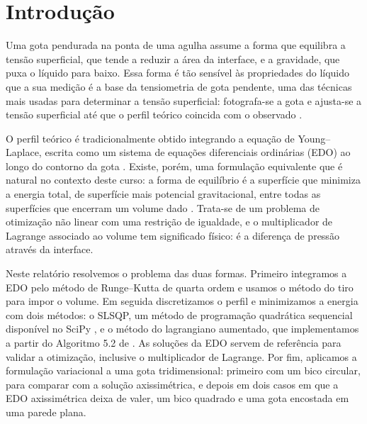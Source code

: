 \documentclass[12pt, oneside, a4paper, english, brazil]{abntex2}
\theoremstyle{relatorio}
\theoremstyle{relatorioit}
\theoremstyle{problema}
\begin{document}
\pretextual
\imprimircapa

\textual
\setcounter{page}{1}
\tableofcontents
\cleardoublepage

\chapter{Introdução}

Uma gota pendurada na ponta de uma agulha assume a forma que equilibra a tensão
superficial, que tende a reduzir a área da interface, e a gravidade, que puxa o
líquido para baixo. Essa forma é tão sensível às propriedades do líquido que a sua
medição é a base da tensiometria de gota pendente, uma das técnicas mais usadas para
determinar a tensão superficial: fotografa-se a gota e ajusta-se a tensão
superficial até que o perfil teórico coincida com o observado \parencite{berry2015}.

O perfil teórico é tradicionalmente obtido integrando a equação de Young--Laplace,
escrita como um sistema de equações diferenciais ordinárias (EDO) ao longo do contorno
da gota \parencite{hartland1976}. Existe, porém, uma formulação equivalente que é
natural no contexto deste curso: a forma de equilíbrio é a superfície que minimiza a
energia total, de superfície mais potencial gravitacional, entre todas as superfícies
que encerram um volume dado \parencite{degennes2004}. Trata-se de um problema de
otimização não linear com uma restrição de igualdade, e o multiplicador de Lagrange
associado ao volume tem significado físico: é a diferença de pressão através da
interface.

Neste relatório resolvemos o problema das duas formas. Primeiro integramos a EDO
pelo método de Runge--Kutta de quarta ordem e usamos o método do tiro para impor o
volume. Em seguida discretizamos o perfil e minimizamos a energia com dois métodos: o
SLSQP, um método de programação quadrática sequencial disponível no SciPy
\parencite{kraft1988, virtanen2020}, e o método do lagrangiano aumentado, que
implementamos a partir do Algoritmo 5.2 de \textcite{martins2021}. As soluções da EDO
servem de referência para validar a otimização, inclusive o multiplicador de
Lagrange. Por fim, aplicamos a formulação variacional a uma gota tridimensional:
primeiro com um bico circular, para comparar com a solução axissimétrica, e depois em
dois casos em que a EDO axissimétrica deixa de valer, um bico quadrado e uma gota
encostada em uma parede plana.
\end{document}
